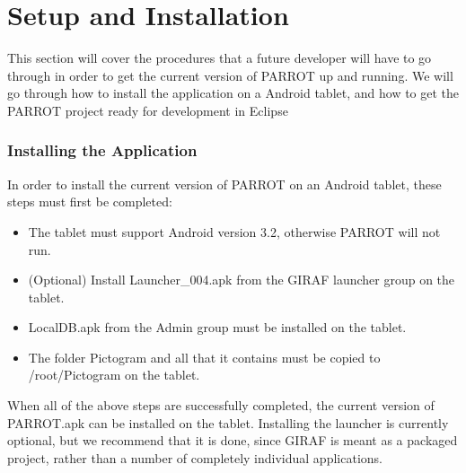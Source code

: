 \chapter{Setup and Installation}
This section will cover the procedures that a future developer will have to go through in order to get the current version of PARROT up and running.
We will go through how to install the application on a Android tablet, and how to get the PARROT project ready for development in Eclipse\newline

\subsection{Installing the Application}
In order to install the current version of PARROT on an Android tablet, these steps must first be completed:
\begin{itemize}
	\item The tablet must support Android version 3.2, otherwise PARROT will not run.
	\item (Optional) Install Launcher\_004.apk from the GIRAF launcher group on the tablet.
	\item LocalDB.apk from the Admin group must be installed on the tablet.
	\item The folder Pictogram and all that it contains must be copied to /root/Pictogram on the tablet.
\end{itemize}
When all of the above steps are successfully completed, the current version of PARROT.apk can be installed on the tablet.
Installing the launcher is currently optional, but we recommend that it is done, since GIRAF is meant as a packaged project, rather than a number of completely individual applications.

